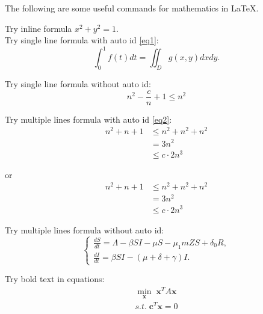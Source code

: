 \documentclass[UTF8]{homework}
\begin{document}
%
%
\begin{homeworkProblem}
    The following are some useful commands for mathematics in \LaTeX.

    \solution

    Try inline formula $x^2+y^2=1$. \\
    
    Try single line formula with auto id \ref{eq1}:
    \begin{equation}\label{eq1}
        \int_0^1f(t)dt = \iint_Dg(x,y)dxdy.
    \end{equation}

    Try single line formula without auto id:
    \begin{equation*}
        n^2 - \dfrac{c}{n} + 1 \leq n^2
    \end{equation*}

    Try multiple lines formula with auto id \ref{eq2}:
    \begin{equation}\label{eq2}
        \begin{split}
            n^2 + n + 1 &\leq n^2 + n^2 + n^2 \\
            &= 3n^2 \\
            &\leq c \cdot 2n^3
        \end{split}
    \end{equation}

    or
    \begin{align}
        n^2 + n + 1 &\leq n^2 + n^2 + n^2 \\
        &= 3n^2 \\
        &\leq c \cdot 2n^3
    \end{align}

    Try multiple lines formula without auto id:
    \begin{equation*}
        \begin{cases}
            \frac{dS}{dt} = \Lambda - \beta SI - \mu S -\mu_1 mZS + \delta_0R, \\
            \frac{dI}{dt} = \beta SI - (\mu+\delta+\gamma)I.
        \end{cases}
    \end{equation*}

    Try bold text in equations:
    \begin{align*}
        \min_{\bm{x}} \; \bm{x}^T A \bm{x} \\
        s.t. \; \bm{c}^T \bm{x} = 0
    \end{align*}
    
\end{homeworkProblem}
\end{document}
